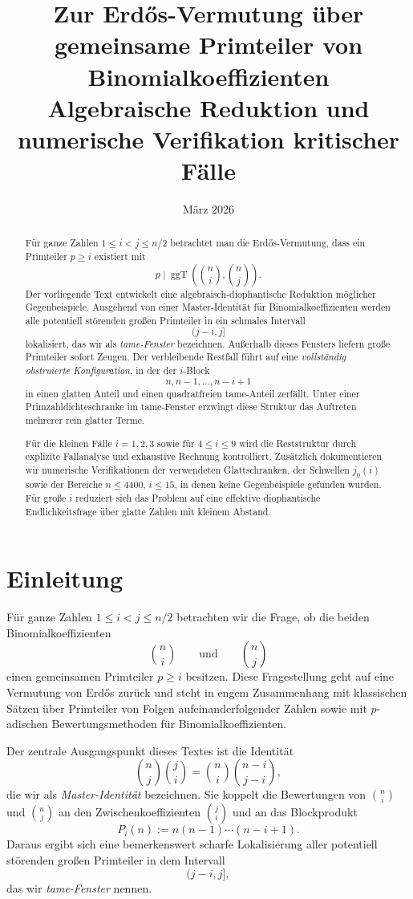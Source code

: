 \documentclass[12pt,a4paper]{article}
\title{Zur Erdős-Vermutung über gemeinsame Primteiler von Binomialkoeffizienten\\
	\large Algebraische Reduktion und numerische Verifikation kritischer Fälle}
\author{}
\date{März 2026}
\theoremstyle{plain}
\theoremstyle{definition}
\theoremstyle{remark}
\newcommand{\ggT}{\operatorname{ggT}}
\begin{document}
	
	\maketitle
	
	\begin{abstract}
		Für ganze Zahlen $1 \le i < j \le n/2$ betrachtet man die Erdős-Vermutung, dass ein Primteiler $p \ge i$ existiert mit
		\[
		p \mid \ggT\!\left(\binom{n}{i},\binom{n}{j}\right).
		\]
		Der vorliegende Text entwickelt eine algebraisch-diophantische Reduktion möglicher Gegenbeispiele. 
		Ausgehend von einer Master-Identität für Binomialkoeffizienten werden alle potentiell störenden großen Primteiler in ein schmales Intervall
		\[
		(j-i,j]
		\]
		lokalisiert, das wir als \emph{tame-Fenster} bezeichnen. 
		Außerhalb dieses Fensters liefern große Primteiler sofort Zeugen. 
		Der verbleibende Restfall führt auf eine \emph{vollständig obstruierte Konfiguration}, in der der $i$-Block
		\[
		n,n-1,\dots,n-i+1
		\]
		in einen glatten Anteil und einen quadratfreien tame-Anteil zerfällt. 
		Unter einer Primzahldichteschranke im tame-Fenster erzwingt diese Struktur das Auftreten mehrerer rein glatter Terme.
		
		Für die kleinen Fälle $i=1,2,3$ sowie für $4 \le i \le 9$ wird die Reststruktur durch explizite Fallanalyse und exhaustive Rechnung kontrolliert. 
		Zusätzlich dokumentieren wir numerische Verifikationen der verwendeten Glattschranken, der Schwellen $j_0(i)$ sowie der Bereiche $n \le 4400$, $i \le 15$, in denen keine Gegenbeispiele gefunden wurden. 
		Für große $i$ reduziert sich das Problem auf eine effektive diophantische Endlichkeitsfrage über glatte Zahlen mit kleinem Abstand.
	\end{abstract}
	
	\tableofcontents
	
	\section{Einleitung}
	
	Für ganze Zahlen $1 \le i < j \le n/2$ betrachten wir die Frage, ob die beiden Binomialkoeffizienten
	\[
	\binom{n}{i}
	\qquad\text{und}\qquad
	\binom{n}{j}
	\]
	einen gemeinsamen Primteiler $p \ge i$ besitzen. 
	Diese Fragestellung geht auf eine Vermutung von Erdős zurück und steht in engem Zusammenhang mit klassischen Sätzen über Primteiler von Folgen aufeinanderfolgender Zahlen sowie mit $p$-adischen Bewertungsmethoden für Binomialkoeffizienten.
	
	Der zentrale Ausgangspunkt dieses Textes ist die Identität
	\[
	\binom{n}{j}\binom{j}{i}
	=
	\binom{n}{i}\binom{n-i}{j-i},
	\]
	die wir als \emph{Master-Identität} bezeichnen. 
	Sie koppelt die Bewertungen von $\binom{n}{i}$ und $\binom{n}{j}$ an den Zwischenkoeffizienten $\binom{j}{i}$ und an das Blockprodukt
	\[
	P_i(n):=n(n-1)\cdots(n-i+1).
	\]
	Daraus ergibt sich eine bemerkenswert scharfe Lokalisierung aller potentiell störenden großen Primteiler in dem Intervall
	\[
	(j-i,j],
	\]
	das wir \emph{tame-Fenster} nennen.
	
\end{document}
